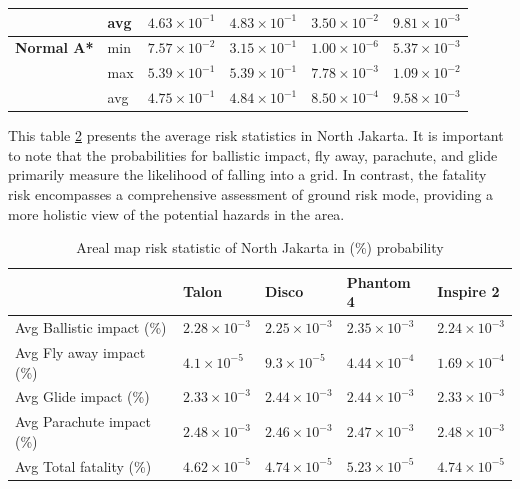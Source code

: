\documentclass[12pt]{report}
\begin{document}
\begin{table}[H]
\begin{tabular}{|l l l l l l |}
                                        & avg & \(4.63 \times 10^{-1}\) & \(4.83 \times 10^{-1}\) & \(3.50 \times 10^{-2}\) & \(9.81 \times 10^{-3}\) \\
                \hline
                \textbf{Normal A*} & min & \(7.57 \times 10^{-2}\) & \(3.15 \times 10^{-1}\) & \(1.00 \times 10^{-6}\) & \(5.37 \times 10^{-3}\) \\
                                   & max & \(5.39 \times 10^{-1}\) & \(5.39 \times 10^{-1}\) & \(7.78 \times 10^{-3}\) & \(1.09 \times 10^{-2}\) \\
                                   & avg & \(4.75 \times 10^{-1}\) & \(4.84 \times 10^{-1}\) & \(8.50 \times 10^{-4}\) & \(9.58 \times 10^{-3}\) \\
                \hline
            \end{tabular}
            \captionsetup{justification=justified} %
            \label{tab:pathway-risk}
        \end{table}

        This table \ref{tab:total-map-risk} presents the average risk statistics in North Jakarta. It is
        important to note that the probabilities for ballistic impact, fly away, parachute, and glide primarily measure the
        likelihood of falling into a grid. In contrast, the fatality risk encompasses a comprehensive assessment of ground
        risk mode, providing a more holistic view of the potential hazards in the area.

        \begin{table}[H]
            \centering
            \caption{Areal map risk statistic of North Jakarta in (\%) probability} %
            \begin{tabular}{|lllll|}
                \hline
                \textbf{} & \textbf{Talon} & \textbf{Disco} & \textbf{Phantom 4} & \textbf{Inspire 2} \\
                \hline
                {Avg Ballistic impact (\%)} & \(2.28 \times 10^{-3}\) & \(2.25 \times 10^{-3}\) & \(2.35 \times 10^{-3}\) & \(2.24 \times 10^{-3}\) \\
                {Avg Fly away impact (\%)} & \(4.1 \times 10^{-5}\) & \(9.3 \times 10^{-5}\) & \(4.44 \times 10^{-4}\) & \(1.69 \times 10^{-4}\) \\
                {Avg Glide impact (\%)} & \(2.33 \times 10^{-3}\) & \(2.44 \times 10^{-3}\) & \(2.44 \times 10^{-3}\) & \(2.33 \times 10^{-3}\) \\
                {Avg Parachute impact (\%)} & \(2.48 \times 10^{-3}\) & \(2.46 \times 10^{-3}\) & \(2.47 \times 10^{-3}\) & \(2.48 \times 10^{-3}\) \\
                {Avg Total fatality (\%)} & \(4.62 \times 10^{-5}\) & \(4.74 \times 10^{-5}\) & \(5.23 \times 10^{-5}\) & \(4.74 \times 10^{-5}\) \\
                \hline
            \end{tabular}
            \label{tab:total-map-risk}
        \end{table}
\end{document}
